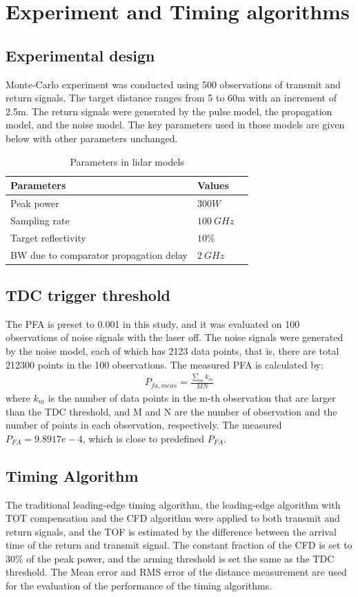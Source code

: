 \section{Experiment and Timing algorithms}
\subsection{Experimental design}
Monte-Carlo experiment was conducted using 500 observations of transmit and return signals. The target distance ranges from 5 to 60m with an increment of 2.5m. The return signals were generated by the pulse model, the propagation model, and the noise model. The key parameters used in those models are given below with other parameters unchanged.
\begin{table}
\caption{{Parameters in lidar models}}
\centering
\label{table:lidarspec}
\begin{tabular}{|l|l|l|}
\hline
Parameters    & Values \\ \hline
Peak power & $300 W$              \\ \hline
Sampling rate & $100~GHz$      \\ \hline
Target reflectivity & $10\%$     \\ \hline
BW due to comparator propagation delay & $2~GHz$        \\ \hline
\end{tabular}%
\end{table}
\subsection{TDC trigger threshold}
The PFA is preset to 0.001 in this study, and it was evaluated on 100 observations of noise signals with the laser off. The noise signals were generated by the noise model, each of which has 2123 data points, that is, there are total 212300 points in the 100 observations. The measured PFA is calculated by:
\begin{align}
    P_{fa,meas}=\frac{\sum_{m} k_m}{MN}
\end{align}
where $k_m$ is the number of data points in the m-th observation that are larger than the TDC threshold, and M and N are the number of observation and the number of points in each observation, respectively. The measured $P_{FA} = 9.8917e-4$, which is close to predefined $P_{FA}$.
\subsection{Timing Algorithm}
The traditional leading-edge timing algorithm, the leading-edge algorithm with TOT compensation and the CFD algorithm were applied to both transmit and return signals, and the TOF is estimated by the difference between the arrival time of the return and transmit signal. The constant fraction of the CFD is set to $30\%$ of the peak power, and the arming threshold is set the same as the TDC threshold. The Mean error and RMS error of the distance measurement are used for the evaluation of the performance of the timing algorithms.

